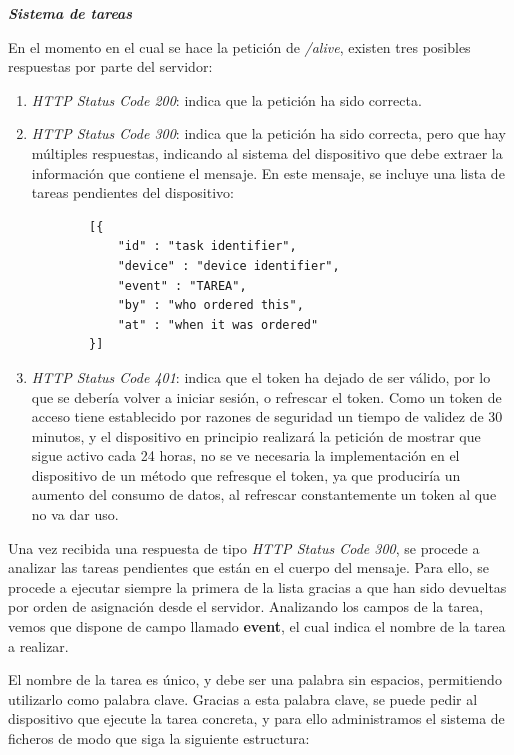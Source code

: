         \textit{\textbf{Sistema de tareas}}
        
        En el momento en el cual se hace la petición de \textit{/alive}, existen tres posibles respuestas por parte del servidor:
        \begin{enumerate}
            \item \textit{HTTP Status Code 200}: indica que la petición ha sido correcta.
            \item \textit{HTTP Status Code 300}: indica que la petición ha sido correcta, pero que hay múltiples respuestas, indicando al sistema del dispositivo que debe extraer la información que contiene el mensaje. En este mensaje, se incluye una lista de tareas pendientes del dispositivo:
            
            \newpage            
        \begin{lstlisting}
        [{
            "id" : "task identifier",
            "device" : "device identifier",
            "event" : "TAREA",
            "by" : "who ordered this",
            "at" : "when it was ordered"
        }]
        \end{lstlisting}
        
        
            \item \textit{HTTP Status Code 401}: indica que el token ha dejado de ser válido, por lo que se debería volver a iniciar sesión, o refrescar el token. Como un token de acceso tiene establecido por razones de seguridad un tiempo de validez de 30 minutos, y el dispositivo en principio realizará la petición de mostrar que sigue activo cada 24 horas, no se ve necesaria la implementación en el dispositivo de un método que refresque el token, ya que produciría un aumento del consumo de datos, al refrescar constantemente un token al que no va dar uso.
            
        \end{enumerate}
        \label{seq:received300}
        
        Una vez recibida una respuesta de tipo \textit{HTTP Status Code 300}, se procede a analizar las tareas pendientes que están en el cuerpo del mensaje. Para ello, se procede a ejecutar siempre la primera de la lista gracias a que han sido devueltas por orden de asignación desde el servidor.
        Analizando los campos de la tarea, vemos que dispone de campo llamado \textbf{event}, el cual indica el nombre de la tarea a realizar.
        
        El nombre de la tarea es único, y debe ser una palabra sin espacios, permitiendo utilizarlo como palabra clave.
        Gracias a esta palabra clave, se puede pedir al dispositivo que ejecute la tarea concreta, y para ello administramos el sistema de ficheros de modo que siga la siguiente estructura:
        
